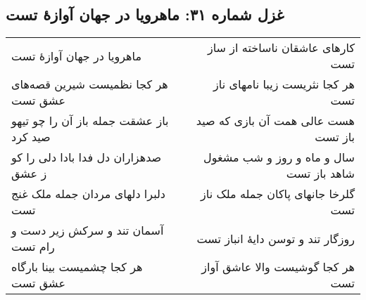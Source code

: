 \begin{center}
\section*{غزل شماره ۳۱: ماهرویا در جهان آوازهٔ تست}
\label{sec:031}
\begin{longtable}{l p{0.5cm} r}
ماهرویا در جهان آوازهٔ تست
&&
کارهای عاشقان ناساخته از ساز تست
\\
هر کجا نظمیست شیرین قصه‌های عشق تست
&&
هر کجا نثریست زیبا نامهای ناز تست
\\
باز عشقت جمله باز آن را چو تیهو صید کرد
&&
هست عالی همت آن بازی که صید باز تست
\\
صدهزاران دل فدا بادا دلی را کو ز عشق
&&
سال و ماه و روز و شب مشغول شاهد باز تست
\\
دلبرا دلهای مردان جمله ملک غنج تست
&&
گلرخا جانهای پاکان جمله ملک ناز تست
\\
آسمان تند و سرکش زیر دست و رام تست
&&
روزگار تند و توسن دایهٔ انباز تست
\\
هر کجا چشمیست بینا بارگاه عشق تست
&&
هر کجا گوشیست والا عاشق آواز تست
\\
\end{longtable}
\end{center}
